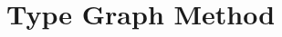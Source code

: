 \documentclass{beamer}
\newcommand{\graphbox}[8]{
  \begin{scope}[xshift=#2,yshift=#3]
    \draw [rounded corners=2mm] (0,0) rectangle (#4,-#5);
    \node at (0,0mm) [anchor=north west,inner sep=1mm] {#1};
    \begin{scope}[xshift=#4/2+#6,yshift=#7] 
    #8
    \end{scope}
  \end{scope}
}
\begin{document}



\section{Type Graph Method}
\end{document}
